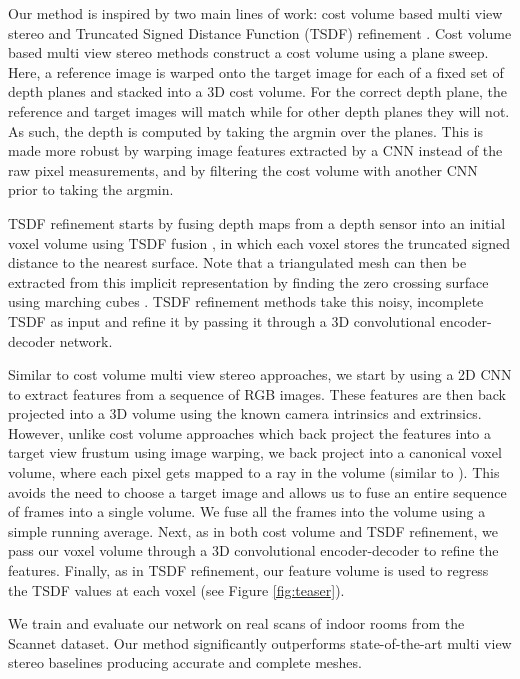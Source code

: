 \documentclass[runningheads]{llncs}
\begin{document}
Our method is inspired by two main lines of work: cost volume based multi view stereo \cite{im2019dpsnet, yao2018mvsnet} and Truncated Signed Distance Function (TSDF) refinement \cite{dai2019sg, dai2018scancomplete}.
Cost volume based multi view stereo methods construct a cost volume using a plane sweep.
Here, a reference image is warped onto the target image for each of a fixed set of depth planes and stacked into a 3D cost volume.
For the correct depth plane, the reference and target images will match while for other depth planes they will not.
As such, the depth is computed by taking the argmin over the planes.
This is made more robust by warping image features extracted by a CNN instead of the raw pixel measurements,
and by filtering the cost volume with another CNN prior to taking the argmin.

TSDF refinement starts by fusing depth maps from a depth sensor into an initial voxel volume using TSDF fusion \cite{curless1996volumetric},
in which each voxel stores the truncated signed distance to the nearest surface.
Note that a triangulated mesh can then be extracted from this implicit representation by finding the zero crossing surface using marching cubes \cite{lorensen1987marching}.
TSDF refinement methods \cite{dai2019sg, dai2018scancomplete} take this noisy, incomplete TSDF as input and refine it by passing it
through a 3D convolutional encoder-decoder network.

Similar to cost volume multi view stereo approaches, we start by using a 2D CNN to extract features from a sequence of RGB images.
These features are then back projected into a 3D volume using the known camera intrinsics and extrinsics.
However, unlike cost volume approaches which back project the features into a target view frustum using image warping,
we back project into a canonical voxel volume, where each pixel gets mapped to a ray in the volume (similar to \cite{sitzmann2019deepvoxels}).
This avoids the need to choose a target image and allows us to fuse an entire sequence of frames into a single volume.
We fuse all the frames into the volume using a simple running average.
Next, as in both cost volume and TSDF refinement, we pass our voxel volume through a 3D convolutional encoder-decoder
to refine the features.
Finally, as in TSDF refinement, our feature volume is used to regress the TSDF values at each voxel (see Figure \ref{fig:teaser}).

We train and evaluate our network on real scans of indoor rooms from the Scannet\cite{dai2017scannet} dataset.
Our method significantly outperforms state-of-the-art multi view stereo baselines \cite{im2019dpsnet, wang2018mvdepthnet} producing
accurate and complete meshes.
\end{document}
